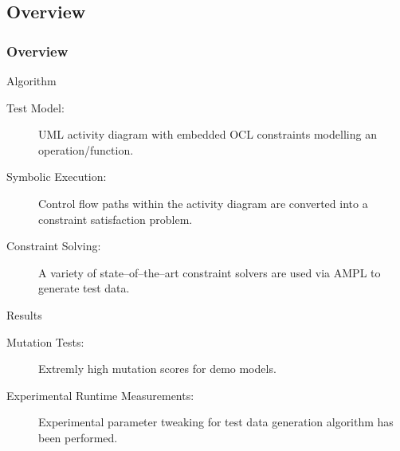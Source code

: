 \documentclass{beamer}
\begin{document}
\subsection{Overview}
\begin{frame}
\frametitle{Overview}
\begin{block}{Algorithm}
\begin{description}
\item[Test Model:] UML activity diagram with embedded OCL constraints modelling an operation/function.
\item[Symbolic Execution:] Control flow paths within the activity diagram are converted into a constraint satisfaction problem.
\item[Constraint Solving:] A variety of state--of--the--art constraint solvers are used via AMPL to generate test data.
\end{description}
\end{block}
\begin{block}{Results}
\begin{description}
\item[Mutation Tests:] Extremly high mutation scores for demo models.
\item[Experimental Runtime Measurements:] Experimental parameter tweaking for test data generation algorithm has been performed.
\end{description}
\end{block}
\end{frame}
\end{document}
